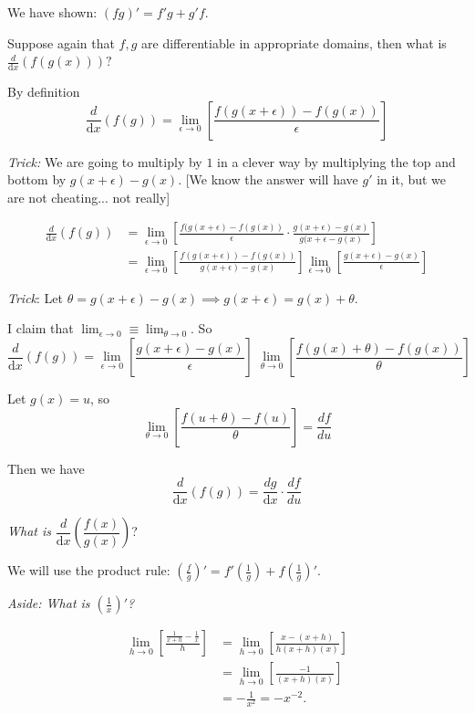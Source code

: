 \documentclass[10pt]{scrartcl}
\begin{document}
We have shown: ${(fg)' = f'g + g'f}$. 



Suppose again that $f,g$ are differentiable in appropriate domains, then what is
$\frac{d}{\mathrm{d}x}(f(g(x)))?$

By definition
\[\frac{d}{\mathrm{d}x}(f(g)) = \lim_{\epsilon \to 0} \left[\frac{f(g(x+\epsilon)) - f(g(x))}{\epsilon}\right]\]

\emph{Trick:} We are going to multiply by $1$ in a clever way by multiplying the top and bottom by $g(x+\epsilon) - g(x)$. [We know the answer will have $g'$ in it, but we are not cheating... not really] 

\[
\begin{aligned}
  \frac{d}{\mathrm{d}x}(f(g)) &= \lim_{\epsilon \to 0}\left[\frac{f(g(x+\epsilon) - f(g(x))}{\epsilon}\cdot \frac{g(x+\epsilon)-g(x)}{g(x+\epsilon -g(x)}\right]\\[0.2cm]
  &= \lim_{\epsilon \to 0} \left[\frac{f(g(x+\epsilon))-f(g(x))}{g(x+\epsilon)-g(x)}\right]\lim_{\epsilon \to 0}\left[\frac{g(x+\epsilon)-g(x)}{\epsilon}\right]
\end{aligned}
\]\vspace*{10pt}

\emph{Trick}: Let $  \theta = g(x+ \epsilon) -g(x)
  \implies g(x+\epsilon) = g(x) + \theta $.

I claim that $\lim_{\epsilon \to 0}\equiv \lim_{\theta \to 0}$. So
\[\frac{d}{\mathrm{d}x}(f(g)) = \lim_{\epsilon \to 0}\left[\frac{g(x+\epsilon)-g(x)}{\epsilon}\right]\;\lim_{\theta \to 0}\left[\frac{f(g(x) + \theta) -f(g(x))}{\theta}\right]\]

Let $g(x) = u$, so 
\[\lim_{\theta \to 0} \left[\frac{f(u + \theta) - f(u)}{\theta}\right] = \frac{df}{du}\]

Then we have 
\[\boxed{\frac{d}{\mathrm{d}x}(f(g)) = \frac{dg}{\mathrm{d}x}\cdot \frac{df}{du}}\]



\emph{What is} $\dfrac{d}{\mathrm{d}x}\left(\dfrac{f(x)}{g(x)}\right)$? 

We will use the product rule: $\left(\frac{f}{g}\right)' = f'\left(\frac{1}{g}\right) + f\left(\frac{1}{g}\right)'$. 

\emph{Aside: What is $\left(\frac{1}{x}\right)'$?}

\[
\begin{aligned}
  \lim_{h \to 0}\left[\frac{\frac{1}{x+h} - \frac{1}{x}}{h}\right] &= \lim_{h \to 0}\left[\frac{x - (x+h)}{h(x+h)(x)}\right]\\
  &= \lim_{h \to 0}\left[\frac{-1}{(x+h)(x)}\right]\\
  &= -\frac{1}{x^2} = -x^{-2}. 
\end{aligned}
\]
\end{document}
